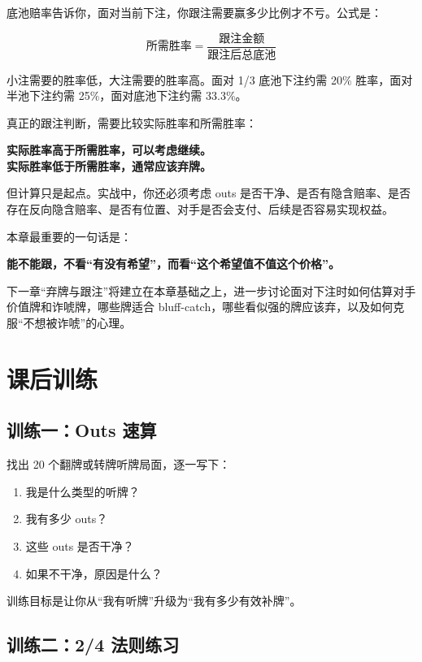 底池赔率告诉你，面对当前下注，你跟注需要赢多少比例才不亏。公式是：

\[
\text{所需胜率} =
\frac{\text{跟注金额}}{\text{跟注后总底池}}
\]

小注需要的胜率低，大注需要的胜率高。面对 1/3 底池下注约需 20\% 胜率，面对半池下注约需 25\%，面对底池下注约需 33.3\%。

真正的跟注判断，需要比较实际胜率和所需胜率：

\begin{center}
\textbf{实际胜率高于所需胜率，可以考虑继续。\\
实际胜率低于所需胜率，通常应该弃牌。}
\end{center}

但计算只是起点。实战中，你还必须考虑 outs 是否干净、是否有隐含赔率、是否存在反向隐含赔率、是否有位置、对手是否会支付、后续是否容易实现权益。

本章最重要的一句话是：

\begin{center}
\textbf{能不能跟，不看“有没有希望”，而看“这个希望值不值这个价格”。}
\end{center}

下一章“弃牌与跟注”将建立在本章基础之上，进一步讨论面对下注时如何估算对手价值牌和诈唬牌，哪些牌适合 bluff-catch，哪些看似强的牌应该弃，以及如何克服“不想被诈唬”的心理。

\section{课后训练}

\subsection*{训练一：Outs 速算}

找出 20 个翻牌或转牌听牌局面，逐一写下：

\begin{enumerate}
\item 我是什么类型的听牌？
\item 我有多少 outs？
\item 这些 outs 是否干净？
\item 如果不干净，原因是什么？
\end{enumerate}

训练目标是让你从“我有听牌”升级为“我有多少有效补牌”。

\subsection*{训练二：2/4 法则练习}

